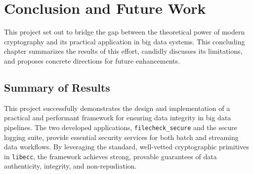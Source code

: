 \documentclass[12pt, letterpaper]{article}
\begin{document}
	\section{Conclusion and Future Work}
	This project set out to bridge the gap between the theoretical power of modern cryptography and its practical application in big data systems. This concluding chapter summarizes the results of this effort, candidly discusses its limitations, and proposes concrete directions for future enhancements.
	
	\subsection{Summary of Results}
	This project successfully demonstrates the design and implementation of a practical and performant framework for ensuring data integrity in big data pipelines. The two developed applications, \texttt{filecheck\_secure} and the secure logging suite, provide essential security services for both batch and streaming data workflows. By leveraging the standard, well-vetted cryptographic primitives in \texttt{libecc}, the framework achieves strong, provable guarantees of data authenticity, integrity, and non-repudiation.
	
\end{document}
